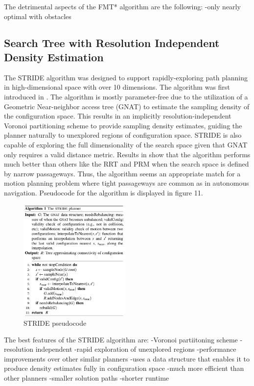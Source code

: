 \documentclass[conference]{IEEEtran} \usepackage[T1]{fontenc} \usepackage[backend=biber, style=ieee]{biblatex}
\begin{document}
The detrimental aspects of the FMT* algorithm are the following:
-only nearly optimal with obstacles


\subsection{Search Tree with Resolution Independent Density Estimation} \label{STRIDE}
The STRIDE algorithm was designed to support rapidly-exploring path planning in high-dimensional space with over 10 dimensions. The algorithm was first introduced
in \cite{stride}. The algorithm is mostly parameter-free due to the utilization of a Geometric Near-neighbor access tree (GNAT) to estimate the sampling density of the 
configuration space. This results in an implicitly resolution-independent Voronoi partitioning scheme to provide sampling density estimates, guiding the planner 
naturally to unexplored regions of configuration space. STRIDE is also capable of exploring the full dimensionality of the search space given that GNAT only requires a 
valid distance metric. Results in \cite{stride} show that the algorithm performs much better than others like the RRT and PRM when the search space is defined
by narrow passageways. Thus, the algorithm seems an appropriate match for a motion planning problem where tight passageways are common as in autonomous navigation.
Pseudocode for the algorithm is displayed in figure 11.

\begin{figure}
\label{figure2} 
\centering 
\includegraphics[width=0.49\textwidth]{stride}
\caption{STRIDE pseudocode}
\end{figure}

The best features of the STRIDE algorithm are:
-Voronoi partiitoning scheme
-resolution independent
-rapid exploration of unexplored regions
-performance improvements over other similar planners
-uses a data structure that enables it to produce density estimates fully in configuration space
-much more efficient than other planners
-smaller solution paths
-shorter runtime
\end{document}
